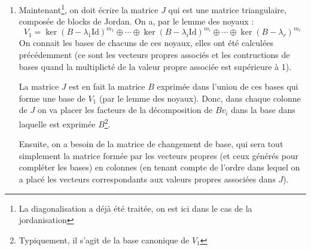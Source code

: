 \documentclass[a4paper,10pt]{article}
\newcommand{\grp}[1]{\left\langle #1 \right\rangle} %
\newcommand{\id}{\mathrm{Id}} %
\begin{document}
\begin{enumerate}
\begin{itemize}
        $\lambda$, de multiplicité 2\footnote{Si la multiplicité $m$
        est supérieure à 2, en posant $(B-\lambda \id)=A$, il faut
        trouver une base de $\ker A^m$. C'est plus compliqué, il faut
        toujours utiliser le lemme des vecteurs cycliques et trouver un
        $w$ qui vérifie toutes les hypothèses requises pour avoir $\ker
        A^m=\grp{w,Aw,A^2w, \hdots, A^{m-1}w}$ et ainsi obtenir notre base
        (Quand $m$ est pair on peut juste réapliquer le même procédé
        en boucle que pour $m=2$, càd que quand on a obtenu $w$ tel
        que $Aw=v$, on va chercher $w_2$ tel que $A^2w_2=w$ etc...).}
        (on répète la méthode pour chaque valeur propre) :\\
        On veut trouver une base de $\ker(B-\lambda \id)^2$, on sait que
        $v$ est un vecteur propre de $B$ et donc que $v \in \ker(B-\lambda
        \id)$.\\
        Il suffit de trouver $w\neq0$ tel que $(B-\lambda \id)w=v\neq0$. En
        effet, ainsi on a que $(B-\lambda \id)^2w=(B-\lambda \id)v=0$. Et
        donc par le lemme des vecteurs cycliques on a que
         $$\ker(B-\lambda \id)^2=\grp{w,Bw}$$
        C'est-à-dire qu'on va résoudre l'équation, pour trouver un $w$ :
         $$v=(B-\lambda \id)w$$
      \end{itemize}
     \item
      Maintenant\footnote{La diagonalisation a déjà été traitée, on est ici dans le cas de la jordanisation}, on doit écrire la matrice $J$ qui est une matrice triangulaire, composée de blocks de Jordan. On a, par le lemme des noyaux : 
       $$V_1=\ker(B-\lambda_1\id)^{m_1} \oplus \cdots \oplus \ker(B-\lambda_i\id)^{m_i} \oplus \cdots \oplus \ker(B-\lambda_r)^{m_r}$$
      On connait les bases de chacuns de ces noyaux, elles ont été calculées précédemment (ce sont les vecteurs propres associés et les contructions de bases quand la multiplicté de la valeur propre associée est supérieure à 1).

      La matrice $J$ est en fait la matrice $B$ exprimée dans l'union de ces bases qui forme une base de $V_1$ (par le lemme des noyaux). Donc, dans chaque colonne de $J$ on va placer les facteurs de la décomposition de $Bv_i$ dans la base dans laquelle est exprimée $B$\footnote{Typiquement, il s'agit de la base canonique de $V_1$}.

      Ensuite, on a besoin de la matrice de changement de base, qui sera tout simplement la matrice formée par les vecteurs propres (et ceux générés pour compléter les bases) en colonnes (en tenant compte de l'ordre dans lequel on a placé les vecteurs correspondants aux valeurs propres associées dans $J$).
    \end{enumerate}
\end{document}
